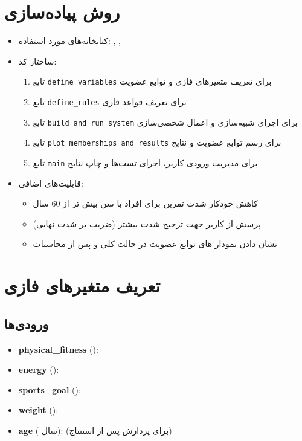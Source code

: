 \documentclass[12pt]{exam}
\begin{document}
	\section{روش پیاده‌سازی}
	\begin{itemize}
		
		\item کتابخانه‌های مورد استفاده: , , 
		\item ساختار کد:
		\begin{enumerate}
			\item تابع \texttt{define\_variables} برای تعریف متغیرهای فازی و توابع عضویت
			\item تابع \texttt{define\_rules} برای تعریف قواعد فازی
			\item تابع \texttt{build\_and\_run\_system} برای اجرای شبیه‌سازی و اعمال شخصی‌سازی
			\item تابع \texttt{plot\_memberships\_and\_results} برای رسم توابع عضویت و نتایج
			\item تابع \texttt{main} برای مدیریت ورودی کاربر، اجرای تست‌ها و چاپ نتایج
		\end{enumerate}
		\item قابلیت‌های اضافی:
		\begin{itemize}
			\item کاهش خودکار شدت تمرین برای افراد با سن بیش تر از 60 سال
			\item پرسش از کاربر جهت ترجیح شدت بیشتر (ضریب  بر شدت نهایی)
			\item نشان دادن نمودار های توابع  عضویت در حالت کلی و پس از محاسبات
		\end{itemize}
	\end{itemize}
	
	\section{تعریف متغیرهای فازی}
	\subsection{ورودی‌ها}
	\begin{itemize}
		\item \textbf{physical\_fitness} (): 
		\item \textbf{energy} ():   
		\item \textbf{sports\_goal} (): 
		\item \textbf{weight} ():   
		\item \textbf{age} ( سال):  (برای پردازش پس از استنتاج)
	\end{itemize}
	
\end{document}
